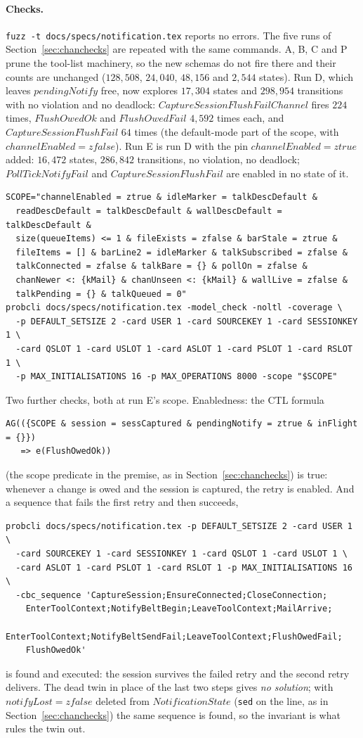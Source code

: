 \documentclass[a4paper,10pt,fleqn]{article}
\begin{document}
\paragraph{Checks.}  \texttt{fuzz -t docs/specs/notification.tex} reports no errors.
The five runs of Section~\ref{sec:chanchecks} are repeated with the same
commands.  A, B, C and P prune the tool-list machinery, so the new schemas do
not fire there and their counts are unchanged ($128{,}508$, $24{,}040$,
$48{,}156$ and $2{,}544$ states).  Run D, which leaves $pendingNotify$ free,
now explores $17{,}304$ states and $298{,}954$ transitions with no violation
and no deadlock: $CaptureSessionFlushFailChannel$ fires $224$ times,
$FlushOwedOk$ and $FlushOwedFail$ $4{,}592$ times each, and
$CaptureSessionFlushFail$ $64$ times (the default-mode part of the scope, with
$channelEnabled = zfalse$).  Run E is run D with the pin
$channelEnabled = ztrue$ added: $16{,}472$ states, $286{,}842$ transitions,
no violation, no deadlock; $PollTickNotifyFail$ and $CaptureSessionFlushFail$
are enabled in no state of it.
\begin{verbatim}
SCOPE="channelEnabled = ztrue & idleMarker = talkDescDefault &
  readDescDefault = talkDescDefault & wallDescDefault = talkDescDefault &
  size(queueItems) <= 1 & fileExists = zfalse & barStale = ztrue &
  fileItems = [] & barLine2 = idleMarker & talkSubscribed = zfalse &
  talkConnected = zfalse & talkBare = {} & pollOn = zfalse &
  chanNewer <: {kMail} & chanUnseen <: {kMail} & wallLive = zfalse &
  talkPending = {} & talkQueued = 0"
probcli docs/specs/notification.tex -model_check -noltl -coverage \
  -p DEFAULT_SETSIZE 2 -card USER 1 -card SOURCEKEY 1 -card SESSIONKEY 1 \
  -card QSLOT 1 -card USLOT 1 -card ASLOT 1 -card PSLOT 1 -card RSLOT 1 \
  -p MAX_INITIALISATIONS 16 -p MAX_OPERATIONS 8000 -scope "$SCOPE"
\end{verbatim}
Two further checks, both at run E's scope.  Enabledness: the CTL formula
\begin{verbatim}
AG(({SCOPE & session = sessCaptured & pendingNotify = ztrue & inFlight = {}})
   => e(FlushOwedOk))
\end{verbatim}
(the scope predicate in the premise, as in Section~\ref{sec:chanchecks}) is
true: whenever a change is owed and the session is captured, the retry is
enabled.  And a sequence that fails the first retry and then succeeds,
\begin{verbatim}
probcli docs/specs/notification.tex -p DEFAULT_SETSIZE 2 -card USER 1 \
  -card SOURCEKEY 1 -card SESSIONKEY 1 -card QSLOT 1 -card USLOT 1 \
  -card ASLOT 1 -card PSLOT 1 -card RSLOT 1 -p MAX_INITIALISATIONS 16 \
  -cbc_sequence 'CaptureSession;EnsureConnected;CloseConnection;
    EnterToolContext;NotifyBeltBegin;LeaveToolContext;MailArrive;
    EnterToolContext;NotifyBeltSendFail;LeaveToolContext;FlushOwedFail;
    FlushOwedOk'
\end{verbatim}
is found and executed: the session survives the failed retry and the second
retry delivers.  The dead twin in place of the last two steps gives \emph{no
solution}; with $notifyLost = zfalse$ deleted from $NotificationState$
(\texttt{sed} on the line, as in Section~\ref{sec:chanchecks}) the same
sequence is found, so the invariant is what rules the twin out.
\end{document}
